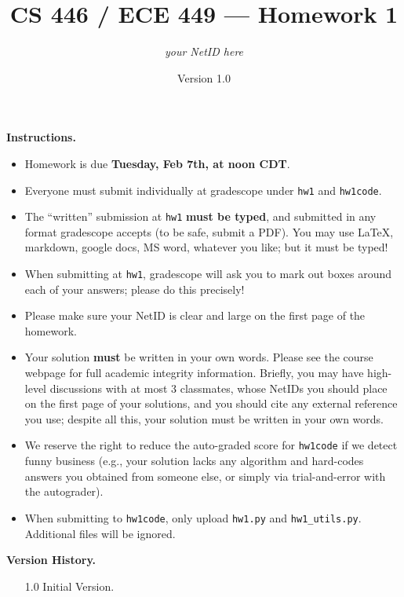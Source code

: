 \documentclass{article}
\title{CS 446 / ECE 449 --- Homework 1}
\author{\emph{your NetID here}}
\date{Version 1.0}
\theoremstyle{definition}
\theoremstyle{remark}
\begin{document}
        \maketitle

        \noindent\textbf{Instructions.}
        \begin{itemize}
          \item
            Homework is due \textbf{Tuesday, Feb 7th, at noon CDT}.
        
          \item
            Everyone must submit individually at gradescope under \texttt{hw1} and \texttt{hw1code}.
        
          \item
            The ``written'' submission at \texttt{hw1} \textbf{must be typed}, and submitted in
            any format gradescope accepts (to be safe, submit a PDF).  You may use \LaTeX, markdown,
            google docs, MS word, whatever you like; but it must be typed!
        
          \item
            When submitting at \texttt{hw1}, gradescope will ask you to mark out boxes
            around each of your answers; please do this precisely!
        
          \item
            Please make sure your NetID is clear and large on the first page of the homework.
        
          \item
            Your solution \textbf{must} be written in your own words.
            Please see the course webpage for full academic integrity information.
            Briefly, you may have high-level discussions with at most 3 classmates,
            whose NetIDs you should place on the first page of your solutions,
            and you should cite any external reference you use; despite all this,
            your solution must be written in your own words.
        
          \item
            We reserve the right to reduce the auto-graded score for
            \texttt{hw1code} if we detect funny business (e.g., your solution
            lacks any algorithm and hard-codes answers you obtained from
            someone else, or simply via trial-and-error with the autograder).
            
          \item
           When submitting to \texttt{hw1code}, only upload \texttt{hw1.py} and \texttt{hw1\_utils.py}. Additional files will be ignored.
        
        \end{itemize}
        \noindent\textbf{Version History.}
        \begin{enumerate}[leftmargin=3\parindent]
        	\item[1.0]
        	Initial Version. 
	\end{enumerate}
       
       \begin{enumerate}[font={\Large\bfseries},left=0pt]
	            
    
    	             
	  
	            
       
                
	 
 
    \end{enumerate}
\end{document}
